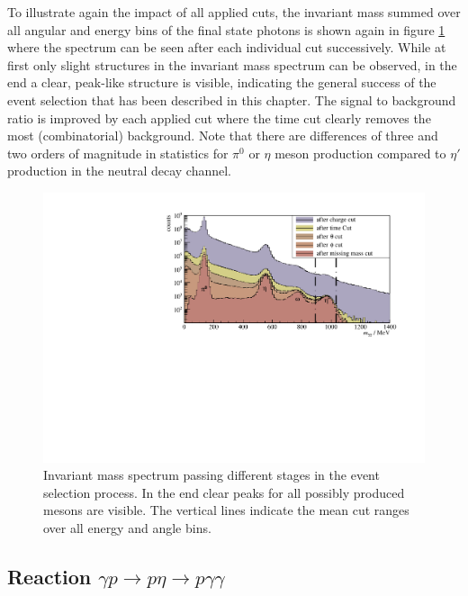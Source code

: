 To illustrate again the impact of all applied cuts, the invariant mass summed over all angular and energy bins of the final state photons is shown again in figure \ref{fig:invm_pretty} where the spectrum can be seen after each individual cut successively. While at first only slight structures in the invariant mass spectrum can be observed, in the end a clear, peak-like structure is visible, indicating the general success of the event selection that has been described in this chapter. The signal to background ratio is improved by each applied cut where the time cut clearly removes the most (combinatorial) background. Note that there are differences of three and two orders of magnitude in statistics for $\pi^0$ or $\eta$ meson production compared to $\eta'$ production in the neutral decay channel. 
\begin{figure}[t]
	\centering
	\includegraphics[width=\linewidth]{../figs/hydrogen/inv_mass_pretty.pdf}
	\caption{Invariant mass spectrum passing different stages in the event selection process. In the end clear peaks for all possibly produced mesons are visible. The vertical lines indicate the mean cut ranges over all energy and angle bins.}
	\label{fig:invm_pretty}
\end{figure}
\subsection{Reaction $\gamma p\to p\eta\to p\gamma\gamma$}
